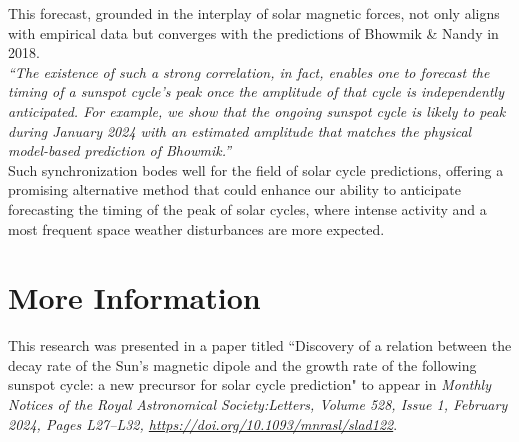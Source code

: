 \documentclass{article}
\begin{document}
This forecast, grounded in the interplay of solar magnetic forces, not only aligns with empirical data but converges with the predictions of Bhowmik \& Nandy in 2018. \\

\textit{“The existence of such a strong correlation, in fact, enables one to forecast the timing of a sunspot cycle’s peak once the amplitude of that cycle is independently anticipated. For example, we show that the ongoing sunspot cycle is likely to peak during January 2024 with an estimated amplitude that matches the physical model-based prediction of Bhowmik.”}\\

 Such synchronization bodes well for the field of solar cycle predictions, offering a promising alternative method that could enhance our ability to anticipate  forecasting the timing of the peak of solar cycles, where intense activity and a most frequent space weather disturbances are more expected.

\section*{\LARGE More Information}

This research was presented in a paper titled “Discovery of a relation between the decay rate of the Sun’s magnetic dipole and the growth rate of the following sunspot cycle: a new precursor for solar cycle prediction" to appear in \textit{Monthly Notices of the Royal Astronomical Society:Letters, Volume 528, Issue 1, February 2024, Pages L27–L32, \href{https://doi.org/10.1093/mnrasl/slad122}{https://doi.org/10.1093/mnrasl/slad122}}.\\
\end{document}
